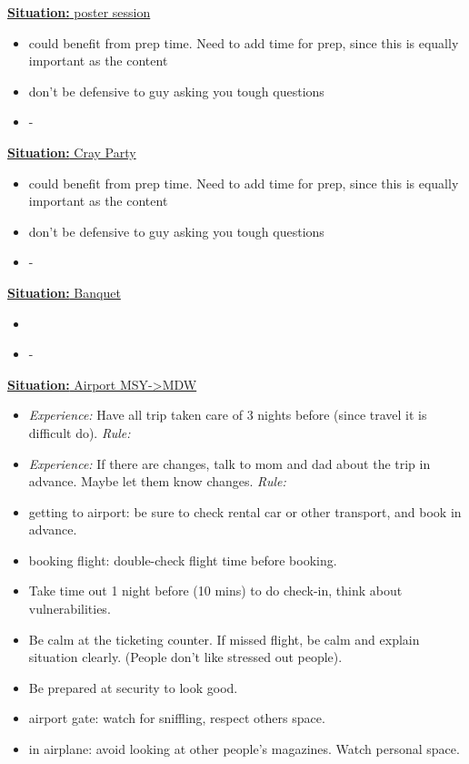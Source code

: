 \documentclass[11pt]{article}
\newcommand{\newSituation}[1]{\underline{\textbf{Situation:} #1} }
\begin{document}
\newSituation{poster session} 
\begin{itemize}
\item could benefit from prep time. Need to add time for prep, since this is equally important as the  content 
\item don't be defensive to guy asking you tough questions
\item - 
\end{itemize} 

\newSituation{Cray Party} 
\begin{itemize}
\item could benefit from prep time. Need to add time for prep, since this is equally important as the  content 
\item don't be defensive to guy asking you tough questions
\item - 
\end{itemize} 

\newSituation{Banquet} 
\begin{itemize}
\item 
\item - 
\end{itemize} 

\newSituation{Airport MSY->MDW} 
\begin{itemize} 
\item \textit{Experience:} Have all trip taken care of 3 nights before (since travel it is difficult do). \textit{Rule:} 
\item \textit{Experience:} If there are changes, talk to mom and dad about the trip in advance. Maybe let them know changes. \textit{Rule:} 
\item getting to airport: be sure to check rental car or other transport, and book in advance. 
\item booking flight: double-check flight time before booking. 
\item Take time out 1 night before (10 mins) to do check-in, think about vulnerabilities. 
\item Be calm at the ticketing counter. If missed flight, be calm and explain situation clearly. (People don't like stressed out people). 
\item Be prepared at security to look good. 
\item airport gate: watch for sniffling, respect others space. 
\item in airplane: avoid looking at other people's magazines. Watch personal space. 
\end{itemize} 
\end{document}
